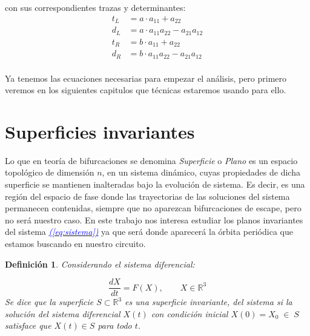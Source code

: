 \documentclass[12pt,a4paper]{report} %
\newtheorem{definicion}{Definición}[chapter] %
\newcommand{\eref}[1]{\hyperref[#1]{\textcolor{blue}{\textit{(\ref*{#1})}}}}
\begin{document}
    con sus correspondientes trazas y determinantes:
    \begin{equation}
    \begin{aligned}
    	t_L &= a \cdot a_{11} + a_{22}\\
    	d_L &= a \cdot a_{11}a_{22} - a_{21}a_{12}\\
    	t_R &= b \cdot a_{11} + a_{22}\\
    	d_R &= b \cdot a_{11}a_{22} - a_{21}a_{12}\\
    \end{aligned}
    \end{equation}\smallskip
    
	Ya tenemos las ecuaciones necesarias para empezar el análisis, pero primero veremos en los siguientes capitulos que técnicas estaremos usando para ello.
	\newpage
	\section{Superficies invariantes}
	\label{sec:2.4}
	\noindent Lo que en teoría de bifurcaciones se denomina \textit{Superficie} o \textit{Plano} es un espacio topológico de dimensión $n$, en un sistema dinámico, cuyas propiedades de dicha superficie se mantienen inalteradas bajo la evolución de sistema. Es decir, es una región del espacio de fase donde las trayectorias de las soluciones del sistema permanecen contenidas, siempre que no aparezcan bifurcaciones de escape, pero no será nuestro caso. En este trabajo nos interesa estudiar los planos invariantes del sistema \eref{eq:sistema} ya que será donde aparecerá la órbita periódica que estamos buscando en nuestro circuito.
	
	\begin{definicion}
		Considerando el sistema diferencial:
		
		\begin{equation}
			\frac{dX}{dt}=F(X),\qquad X\in \mathbb{R}^3
		\end{equation}\smallskip
		Se dice que la superficie $S\subset \mathbb{R}^3$ es una superficie invariante, del sistema si la solución del sistema diferencial $X(t)$ con condición inicial $X(0)=X_0\; \in \; S$ satisface que $X(t) \in S$ para todo $t$.
	\end{definicion}
	
\end{document}
